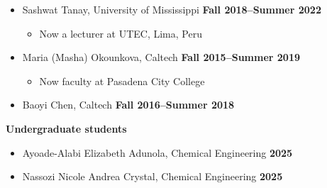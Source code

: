 \documentclass[margin,line]{res}
\begin{document}
\begin{resume}
\begin{itemize}
\hfill {\bf Fall 2018--Summer 2024}
\item[] Sashwat Tanay, University of Mississippi
\hfill {\bf Fall 2018--Summer 2022}
\begin{itemize}
\vspace{-.05in}
\item[] Now a lecturer at UTEC, Lima, Peru
\vspace{-.05in}
\end{itemize}
\item[] Maria (Masha) Okounkova, Caltech
\hfill {\bf Fall 2015--Summer 2019}
\begin{itemize}
\vspace{-.05in}
\item[] Now faculty at Pasadena City College
\end{itemize}
\item[] Baoyi Chen, Caltech
\hfill {\bf Fall 2016--Summer 2018}
\end{itemize}

%

{\bf Undergraduate students}
\begin{itemize}
\item[] Ayoade-Alabi Elizabeth Adunola, Chemical Engineering
\hfill {\bf 2025}
\item[] Nassozi Nicole Andrea Crystal, Chemical Engineering
\hfill {\bf 2025}
\end{itemize}


\end{resume}
\end{document}
